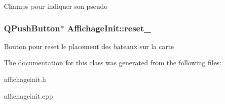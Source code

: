 Champs pour indiquer son pseudo \hypertarget{classAffichageInit_a057a07eb4c76bde07bf75eb0d7a45f73}{
\subsubsection[{reset\+\_\+}]{\setlength{\rightskip}{0pt plus 5cm}Q\+Push\+Button$\ast$ Affichage\+Init\+::reset\+\_\+\hspace{0.3cm}{\ttfamily [protected]}}}\label{classAffichageInit_a057a07eb4c76bde07bf75eb0d7a45f73}
Bouton pour reset le placement des bateaux sur la carte 

The documentation for this class was generated from the following files\+:\begin{DoxyCompactItemize}
\item 
affichageinit.\+h\item 
affichageinit.\+cpp\end{DoxyCompactItemize}
